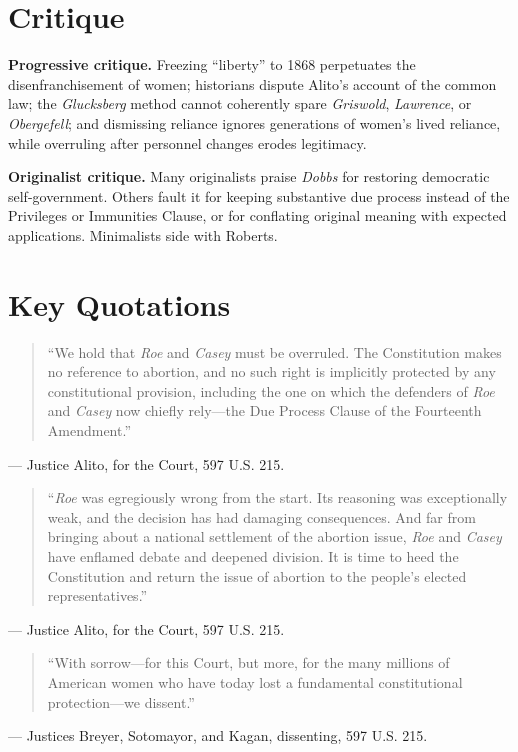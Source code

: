 \documentclass[12pt]{article}
\begin{document}
\section{Critique}

\textbf{Progressive critique.} Freezing ``liberty'' to 1868 perpetuates the disenfranchisement of women; historians dispute Alito's account of the common law; the \textit{Glucksberg} method cannot coherently spare \textit{Griswold}, \textit{Lawrence}, or \textit{Obergefell}; and dismissing reliance ignores generations of women's lived reliance, while overruling after personnel changes erodes legitimacy.

\textbf{Originalist critique.} Many originalists praise \textit{Dobbs} for restoring democratic self-government. Others fault it for keeping substantive due process instead of the Privileges or Immunities Clause, or for conflating original meaning with expected applications. Minimalists side with Roberts.

\section{Key Quotations}

\begin{quote}
``We hold that \textit{Roe} and \textit{Casey} must be overruled. The Constitution makes no reference to abortion, and no such right is implicitly protected by any constitutional provision, including the one on which the defenders of \textit{Roe} and \textit{Casey} now chiefly rely---the Due Process Clause of the Fourteenth Amendment.''
\end{quote}
\noindent --- Justice Alito, for the Court, 597 U.S. 215.

\begin{quote}
``\textit{Roe} was egregiously wrong from the start. Its reasoning was exceptionally weak, and the decision has had damaging consequences. And far from bringing about a national settlement of the abortion issue, \textit{Roe} and \textit{Casey} have enflamed debate and deepened division. It is time to heed the Constitution and return the issue of abortion to the people's elected representatives.''
\end{quote}
\noindent --- Justice Alito, for the Court, 597 U.S. 215.

\begin{quote}
``With sorrow---for this Court, but more, for the many millions of American women who have today lost a fundamental constitutional protection---we dissent.''
\end{quote}
\noindent --- Justices Breyer, Sotomayor, and Kagan, dissenting, 597 U.S. 215.
\end{document}
